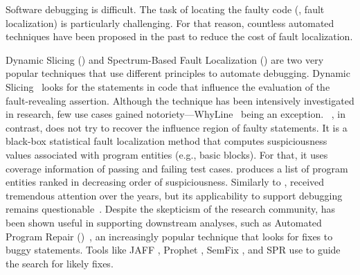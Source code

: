 \documentclass[sigplan,10pt,review,anonymous]{acmart}\settopmatter{printfolios=true,printccs=false,printacmref=false}
\begin{document}
Software debugging is difficult. The task of locating the faulty code
(\ie{}, fault localization) is particularly challenging. For that
reason, countless automated techniques have been proposed in the past
to reduce the cost of fault localization.

Dynamic Slicing (\ds{}) and Spectrum-Based Fault Localization (\sfl{})
are two very popular techniques that use different principles to
automate debugging. Dynamic
Slicing~\cite{Agrawal:1990:DPS:93542.93576} looks for the statements
in code that influence the evaluation of the fault-revealing
assertion. Although the technique has been intensively investigated in
research, few use cases gained
notoriety---WhyLine~\cite{Ko:2008:DRA:1368088.1368130} being an
exception.  \sfl{}~\cite{7390282}, in contrast, does not try to
recover the influence region of faulty statements. It is a black-box
statistical fault localization method that computes suspiciousness
values associated with program entities (e.g., basic blocks). For
that, it uses coverage information of passing and failing test
cases. \sfl{} produces a list of program entities ranked in decreasing
order of suspiciousness. Similarly to \ds{}, \sfl{} received
tremendous attention over the years, but its applicability to support
debugging remains
questionable~\cite{ang-perez-van-deursen-rui-2017,Pearson:2017:EIF:3097368.3097441,Xie:2016:RAD:2884781.2884834}.
Despite the skepticism of the research community, \sfl{} has been
shown useful in supporting downstream analyses, such as Automated
Program Repair
(\apr{})~\cite{automatic-software-repair-survey2017,kim-etal-daghstul2017},
an increasingly popular technique that looks for fixes to buggy
statements. Tools like JAFF \cite{arcuri-2011}, Prophet
\cite{long-rinard-2016}, SemFix \cite{nguyen-qi-roychoudhury-2013},
and SPR \cite{long-rinard-2015} use \sfl{} to guide the search for
likely fixes.


\end{document}
